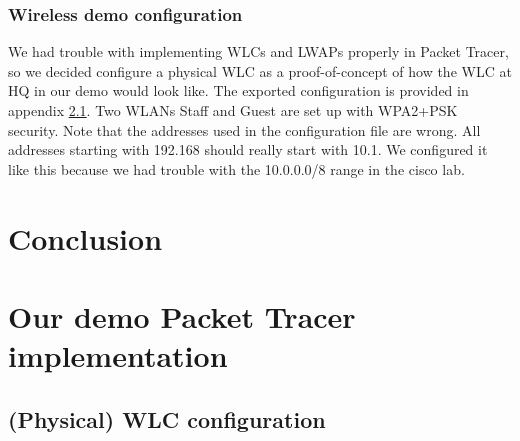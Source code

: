 \subsubsection{Wireless demo configuration} \label{demowireless}

We had trouble with implementing WLCs and LWAPs properly in Packet Tracer, so we decided configure a physical WLC as a proof-of-concept of how the WLC at HQ in our demo would look like. The exported configuration is provided in appendix \ref{configwlc}. Two WLANs Staff and Guest are set up with WPA2+PSK security. Note that the addresses used in the configuration file are wrong. All addresses starting with 192.168 should really start with 10.1. We configured it like this because we had trouble with the 10.0.0.0/8 range in the cisco lab.

\section{Conclusion}



\clearpage %

\nocite{*}





\clearpage %
\appendix

\section{Our demo Packet Tracer implementation} \label{config}


\subsection{(Physical) WLC configuration} \label{configwlc}

\inputminted[fontsize=\tiny,linenos,breaklines]{text}{./wirelessimplementation/wlc.cisco}




